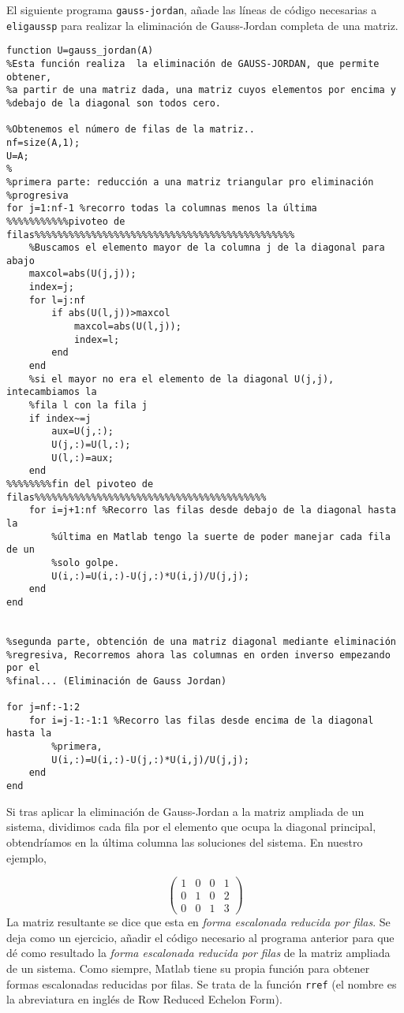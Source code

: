 El siguiente programa \texttt{gauss-jordan}, añade las líneas de código necesarias a \texttt{eligaussp} para realizar la eliminación de Gauss-Jordan completa de una matriz.

\begin{verbatim}
function U=gauss_jordan(A)
%Esta función realiza  la eliminación de GAUSS-JORDAN, que permite obtener,
%a partir de una matriz dada, una matriz cuyos elementos por encima y 
%debajo de la diagonal son todos cero.

%Obtenemos el número de filas de la matriz..
nf=size(A,1);
U=A;
%
%primera parte: reducción a una matriz triangular pro eliminación
%progresiva
for j=1:nf-1 %recorro todas la columnas menos la última
%%%%%%%%%%%pivoteo de filas%%%%%%%%%%%%%%%%%%%%%%%%%%%%%%%%%%%%%%%%%%%%%%    
    %Buscamos el elemento mayor de la columna j de la diagonal para abajo
    maxcol=abs(U(j,j));
    index=j;
    for l=j:nf
        if abs(U(l,j))>maxcol
            maxcol=abs(U(l,j));
            index=l;
        end
    end
    %si el mayor no era el elemento de la diagonal U(j,j), intecambiamos la
    %fila l con la fila j
    if index~=j
        aux=U(j,:);
        U(j,:)=U(l,:);
        U(l,:)=aux;
    end
%%%%%%%%fin del pivoteo de filas%%%%%%%%%%%%%%%%%%%%%%%%%%%%%%%%%%%%%%%%%    
    for i=j+1:nf %Recorro las filas desde debajo de la diagonal hasta la 
        %última en Matlab tengo la suerte de poder manejar cada fila de un 
        %solo golpe.
        U(i,:)=U(i,:)-U(j,:)*U(i,j)/U(j,j);
    end
end


%segunda parte, obtención de una matriz diagonal mediante eliminación
%regresiva, Recorremos ahora las columnas en orden inverso empezando por el
%final... (Eliminación de Gauss Jordan)

for j=nf:-1:2
    for i=j-1:-1:1 %Recorro las filas desde encima de la diagonal hasta la
        %primera, 
        U(i,:)=U(i,:)-U(j,:)*U(i,j)/U(j,j);
    end
end
\end{verbatim}

Si tras aplicar la eliminación de Gauss-Jordan a la matriz ampliada de un sistema, dividimos cada fila por el elemento que ocupa la diagonal principal, obtendríamos en la última columna las soluciones del sistema. En nuestro ejemplo,

\begin{equation*}
\begin{pmatrix}
1&     0&     0&    1\\
 0&    1&    0&    2\\
 0&     0&     1&    3
\end{pmatrix}
\end{equation*}
La matriz resultante se dice que esta en \emph{forma escalonada reducida por filas}. Se deja como un ejercicio, añadir el código necesario al programa anterior para que dé como resultado la \emph{forma escalonada reducida por filas} de la matriz ampliada de un sistema. Como siempre, Matlab tiene su propia función para obtener formas escalonadas reducidas por filas. Se trata de la función \texttt{rref} (el nombre es la abreviatura en inglés de Row Reduced Echelon Form).

